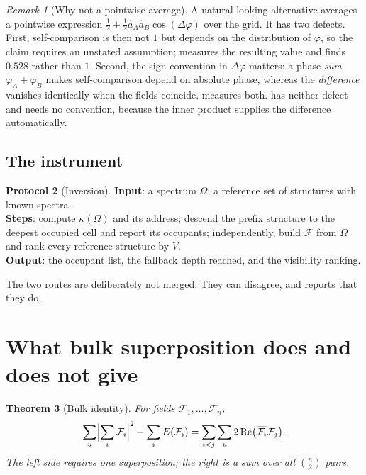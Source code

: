 \documentclass[11pt,twocolumn,a4paper]{article}
\theoremstyle{upthm}
\newtheorem{theorem}{Theorem}[section]
\theoremstyle{definition}
\newtheorem{protocol}[theorem]{Protocol}
\theoremstyle{remark}
\newtheorem{remark}[theorem]{Remark}
\newcommand{\Field}{\mathcal{F}}
\newcommand{\vis}{V}
\begin{document}
\begin{remark}[Why not a pointwise average]
\label{rem:convention}
A natural-looking alternative averages a pointwise expression
$\tfrac12+\tfrac12\hat a_A\hat a_B\cos(\Delta\varphi)$ over the grid.
It has two defects. First, self-comparison is then not $1$ but depends on
the distribution of $\varphi$, so the claim requires an unstated
assumption;  measures the resulting value and finds
$0.528$ rather than $1$. Second, the sign convention in
$\Delta\varphi$ matters: a phase \emph{sum} $\varphi_A+\varphi_B$ makes
self-comparison depend on absolute phase, whereas the \emph{difference}
vanishes identically when the fields coincide. 
measures both.  has neither defect and needs no convention,
because the inner product supplies the difference automatically.
\end{remark}

\subsection{The instrument}

\begin{protocol}[Inversion]
\label{prot:invert}
\textbf{Input}: a spectrum $\Omega$; a reference set of structures with
known spectra.\\
\textbf{Steps}: compute $\kappa(\Omega)$ and its address; descend the
prefix structure to the deepest occupied cell and report its occupants;
independently, build $\Field$ from $\Omega$ and rank every reference
structure by $\vis$.\\
\textbf{Output}: the occupant list, the fallback depth reached, and the
visibility ranking.
\end{protocol}

The two routes are deliberately not merged. They can disagree, and
 reports that they do.

\section{What bulk superposition does and does not give}
\label{sec:bulk}

\begin{theorem}[Bulk identity]
\label{thm:bulkid}
For fields $\Field_1,\dots,\Field_n$,
\begin{equation}
\sum_u\Bigl\lvert\sum_{i}\Field_i\Bigr\rvert^2
 -\sum_i E(\Field_i)
 =\sum_{i<j}\sum_u 2\operatorname{Re}
   \bigl(\overline{\Field_i}\Field_j\bigr).
\label{eq:bulk}
\end{equation}
The left side requires one superposition; the right is a sum over all
$\binom{n}{2}$ pairs.
\end{theorem}
\end{document}

